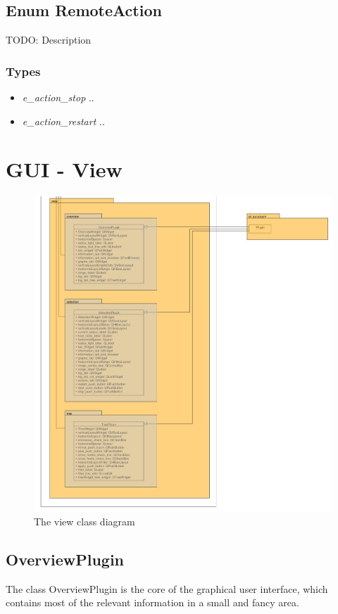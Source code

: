 \subsection{Enum RemoteAction}
TODO: Description
\subsubsection{Types}
\begin{itemize}
	\item \textit{e\_action\_stop}
	..
	\item \textit{e\_action\_restart}
	..
\end{itemize}

\section{GUI - View}
\begin{figure}[!ht]
\begin{center}
\includegraphics[width=\linewidth]{./bilder/view.png}
\caption{The view class diagram}
\end{center}
\end{figure}

\subsection{OverviewPlugin}
The class OverviewPlugin is the core of the graphical user interface, which
contains most of the relevant information in a small and fancy area.
